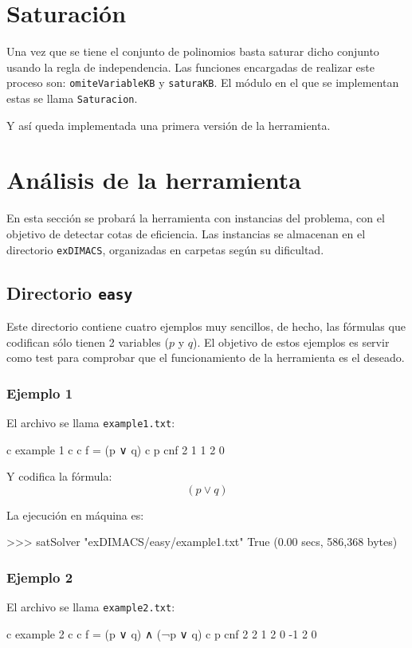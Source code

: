 \section{Saturación}

Una vez que se tiene el conjunto de polinomios basta saturar dicho conjunto usando la regla de independencia. Las funciones encargadas de realizar este proceso son: \texttt{omiteVariableKB} y \texttt{saturaKB}. El módulo en el que se implementan estas se llama \texttt{Saturacion}.


Y así queda implementada una primera versión de la herramienta.

\newpage
\section{Análisis de la herramienta}

En esta sección se probará la herramienta con instancias del problema, con el objetivo de detectar cotas de eficiencia. Las instancias se almacenan en el directorio \texttt{exDIMACS}, organizadas en carpetas según su dificultad.

\subsection{Directorio \texttt{easy}}
Este directorio contiene cuatro ejemplos muy sencillos, de hecho, las fórmulas que codifican sólo  tienen 2 variables ($p$ y $q$). El objetivo de estos ejemplos es servir como test para comprobar que el funcionamiento de la herramienta es el deseado.

\subsubsection{Ejemplo 1}

El archivo se llama \texttt{example1.txt}:
\begin{codigo}
c example 1 
c 
c f = (p ∨ q)
c
p cnf 2 1 
1 2 0
\end{codigo}

Y codifica la fórmula:
$$(p \vee q)$$

La ejecución en máquina es:
\begin{code}
>>> satSolver "exDIMACS/easy/example1.txt"
True
(0.00 secs, 586,368 bytes)
\end{code}
\subsubsection{Ejemplo 2}
El archivo se llama \texttt{example2.txt}:
\begin{codigo}
c example 2
c 
c f = (p ∨ q) ∧ (¬p ∨ q)
c
p cnf 2 2
1 2 0
-1 2 0
\end{codigo}

